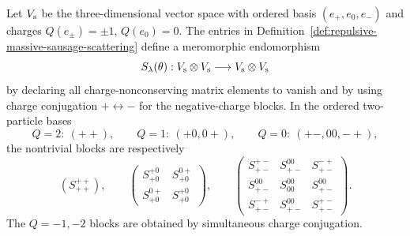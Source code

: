 \begin{definition}
\label{def:sausage-full-triplet-matrix}
Let \(V_{\rm s}\) be the three-dimensional vector space with ordered basis
\((e_+,e_0,e_-)\) and charges \(Q(e_\pm)=\pm1\), \(Q(e_0)=0\).  The entries
in Definition~\ref{def:repulsive-massive-sausage-scattering} define a
meromorphic endomorphism
\[
  S_\lambda(\theta):V_{\rm s}\otimes V_{\rm s}
  \longrightarrow V_{\rm s}\otimes V_{\rm s}
\]
by declaring all charge-nonconserving matrix elements to vanish and by using
charge conjugation \(+\leftrightarrow-\) for the negative-charge blocks.  In
the ordered two-particle bases
\[
  Q=2:\ (++),\qquad
  Q=1:\ (+0,0+),\qquad
  Q=0:\ (+-,00,-+),
\]
the nontrivial blocks are respectively
\[
  (S_{++}^{++}),\qquad
  \begin{pmatrix}
    S_{+0}^{+0}&S_{+0}^{0+}\\
    S_{+0}^{0+}&S_{+0}^{+0}
  \end{pmatrix},
  \qquad
  \begin{pmatrix}
    S_{+-}^{+-}&S_{+-}^{00}&S_{+-}^{-+}\\
    S_{+-}^{00}&S_{00}^{00}&S_{+-}^{00}\\
    S_{+-}^{-+}&S_{+-}^{00}&S_{+-}^{+-}
  \end{pmatrix}.
\]
The \(Q=-1,-2\) blocks are obtained by simultaneous charge conjugation.
\end{definition}

